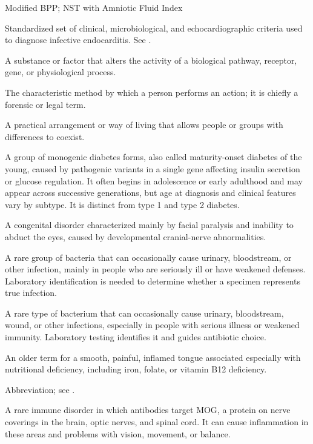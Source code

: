 \synonyms
Modified BPP; NST with Amniotic Fluid Index

 Standardized set of clinical, microbiological, and echocardiographic criteria used to diagnose infective endocarditis. See .

 A substance or factor that alters the activity of a biological pathway, receptor, gene, or physiological process.

 The characteristic method by which a person performs an action; it is chiefly a forensic or legal term.

 A practical arrangement or way of living that allows people or groups with differences to coexist.

 A group of monogenic diabetes forms, also called maturity-onset diabetes of the young, caused by pathogenic variants in a single gene affecting insulin secretion or glucose regulation.
It often begins in adolescence or early adulthood and may appear across
successive generations, but age at diagnosis and clinical features vary by
subtype. It is distinct from type 1 and type 2 diabetes.

 A congenital disorder characterized mainly by facial paralysis and inability to abduct the eyes, caused by developmental cranial-nerve abnormalities.

 A rare group of bacteria that can occasionally cause urinary, bloodstream, or other infection, mainly in people who are seriously ill or have weakened defenses. Laboratory identification is needed to determine whether a specimen represents true infection.

 A rare type of bacterium that can occasionally cause urinary, bloodstream, wound, or other infections, especially in people with serious illness or weakened immunity. Laboratory testing identifies it and guides antibiotic choice.

 An older term for a smooth, painful, inflamed tongue associated especially with nutritional deficiency, including iron, folate, or vitamin B12 deficiency.

 Abbreviation; see .

 A rare immune disorder in which antibodies target MOG, a protein on nerve coverings in the brain, optic nerves, and spinal cord. It can cause inflammation in these areas and problems with vision, movement, or balance.

